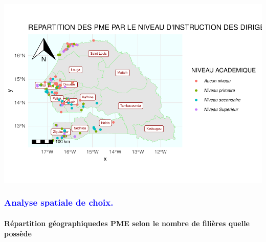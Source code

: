 \documentclass[
]{article}
\begin{document}
\begin{center}\includegraphics{Projet_R_ISE_1_files/figure-latex/unnamed-chunk-36-1} \end{center}

\hfill\break

\textcolor{blue}{\subsubsection{Analyse spatiale de choix.}}

\hfill\break

\hypertarget{ruxe9partition-guxe9ographiquedes-pme-selon-le-nombre-de-filiuxe8res-quelle-possuxe8de}{%
\paragraph{Répartition géographiquedes PME selon le nombre de filières
quelle
possède}\label{ruxe9partition-guxe9ographiquedes-pme-selon-le-nombre-de-filiuxe8res-quelle-possuxe8de}}

\hfill\break
\end{document}
